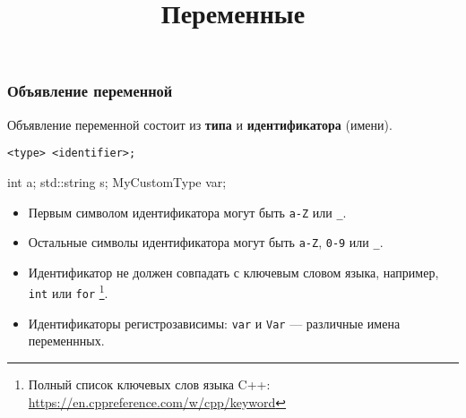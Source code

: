 \documentclass[compress, 8pt]{beamer}
\title{Переменные}
\begin{document}
\frame[plain]{\titlepage}

\begin{frame}[fragile]

    \frametitle{Объявление переменной}

    Объявление переменной состоит из \textbf{типа} и \textbf{идентификатора} (имени).

    \begin{center}

        \verb|<type> <identifier>;|

        \begin{myinplacelisting}[minted language=cpp]
int a;
std::string s;
MyCustomType var;
        \end{myinplacelisting}

    \end{center}

    \begin{itemize}

        \item Первым символом идентификатора могут быть \verb|a-Z| или \verb|_|.

        \item Остальные символы идентификатора могут быть \verb|a-Z|,
            \verb|0-9| или \verb|_|.

        \item Идентификатор не должен совпадать с ключевым словом языка,
            например, \verb|int| или \verb|for|
            \footnote{Полный список ключевых слов языка C++:
                \url{https://en.cppreference.com/w/cpp/keyword}}.

        \item Идентификаторы регистрозависимы: \verb|var| и \verb|Var| ---
            различные имена переменнных.

    \end{itemize}

\end{frame}
\end{document}
